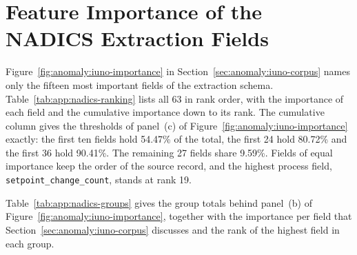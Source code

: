 
\chapter{Feature Importance of the NADICS Extraction Fields}
\label{app:nadics-importance}

Figure~\ref{fig:anomaly:iuno-importance} in Section~\ref{sec:anomaly:iuno-corpus} names only the
fifteen most important fields of the \nadics{} extraction schema. Table~\ref{tab:app:nadics-ranking}
lists all 63 in rank order, with the importance of each field and the cumulative importance down
to its rank. The cumulative column gives the thresholds of panel~(c) of
Figure~\ref{fig:anomaly:iuno-importance} exactly: the first ten fields hold 54.47\% of the
total, the first 24 hold 80.72\% and the first 36 hold 90.41\%. The remaining 27
fields share 9.59\%. Fields of equal importance keep the order of the source record, and
the highest process field, \texttt{setpoint\_change\_count}, stands at rank 19.

\newcommand{\nadicsRankingCaption}{Importance of the 63 fields of the \nadics{} extraction schema
  in the random forest of Section~\ref{sec:anomaly:iuno-results}, in rank order. Importance is the normalised share of the total, and the cumulative column sums
  the importances down to that rank. The letter of the identifier gives the group of
  Table~\ref{tab:app:nadics-groups}, and the bar colours follow
  Figure~\ref{fig:anomaly:iuno-importance}.}


Table~\ref{tab:app:nadics-groups} gives the group totals behind panel~(b) of
Figure~\ref{fig:anomaly:iuno-importance}, together with the importance per field that
Section~\ref{sec:anomaly:iuno-corpus} discusses and the rank of the highest field in each group.

\newcommand{\nadicsGroupsCaption}{Importance by field group. Both shares are given in \% of the
  63-field total. Importance per field is the group share divided by the number of fields in the
  group, and the last column gives the rank of the group's highest field in
  Table~\ref{tab:app:nadics-ranking}.}

